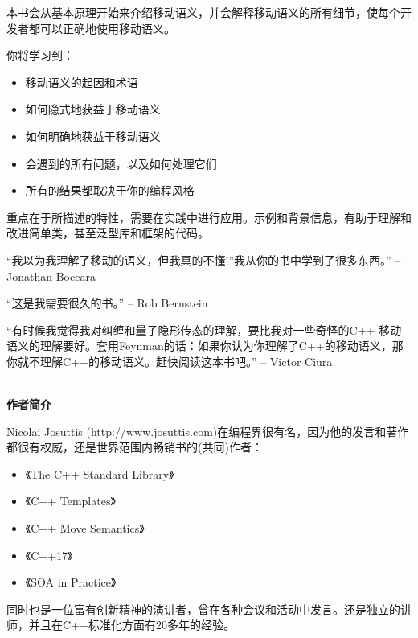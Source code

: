 \documentclass[11pt,a4paper,UTF8]{ctexart}
\begin{document}
	本书会从基本原理开始来介绍移动语义，并会解释移动语义的所有细节，使每个开发者都可以正确地使用移动语义。\par
	
	你将学习到：\par
	
	\begin{itemize}
		\item 移动语义的起因和术语
		\item 如何隐式地获益于移动语义
		\item 如何明确地获益于移动语义
		\item 会遇到的所有问题，以及如何处理它们
		\item 所有的结果都取决于你的编程风格
	\end{itemize}
	
	重点在于所描述的特性，需要在实践中进行应用。示例和背景信息，有助于理解和改进简单类，甚至泛型库和框架的代码。\par
	
	“我以为我理解了移动的语义，但我真的不懂!”我从你的书中学到了很多东西。”	-- Jonathan Boccara\par
	
	“这是我需要很久的书。” -- Rob Bernstein\par
	
	“有时候我觉得我对纠缠和量子隐形传态的理解，要比我对一些奇怪的C++ 移动语义的理解要好。套用Feynman的话：如果你认为你理解了C++的移动语义，那你就不理解C++的移动语义。赶快阅读这本书吧。”	-- Victor Ciura\par
	
	
	\hspace*{\fill} \\ %
	\noindent\textbf{作者简介}\ \par
	Nicolai Josuttis (http://www.josuttis.com)在编程界很有名，因为他的发言和著作都很有权威，还是世界范围内畅销书的(共同)作者：\par
	
	\begin{itemize}
		\item 《The C++ Standard Library》
		\item 《C++ Templates》
		\item 《C++ Move Semantics》
		\item 《C++17》
		\item 《SOA in Practice》
	\end{itemize}
	
	同时也是一位富有创新精神的演讲者，曾在各种会议和活动中发言。还是独立的讲师，并且在C++标准化方面有20多年的经验。\par
	
\end{document}
